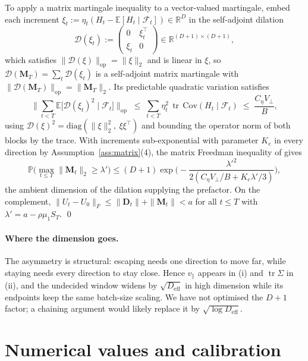 \documentclass{article}
\theoremstyle{plain}
\theoremstyle{definition}
\theoremstyle{remark}
\newcommand{\E}{\mathbb{E}}
\newcommand{\Prob}{\mathbb{P}}
\newcommand{\R}{\mathbb{R}}
\newcommand{\1}{\mathbf{1}}
\newcommand{\cF}{\mathcal{F}}
\newcommand{\Tr}{\operatorname{tr}}
\begin{document}
To apply a matrix martingale inequality to a vector-valued martingale, embed each
increment $\xi_t := \eta_t(H_t-\E[H_t\mid\cF_t])\in\R^D$ in the self-adjoint
dilation
\[
\mathcal D(\xi_t) := \begin{pmatrix}0 & \xi_t^\top\\ \xi_t & 0\end{pmatrix}
\in\R^{(D+1)\times(D+1)},
\]
which satisfies $\|\mathcal D(\xi)\|_{\mathrm{op}} = \|\xi\|_2$ and is linear in
$\xi$, so $\mathcal D(\mathbf M_T) = \sum_t\mathcal D(\xi_t)$ is a self-adjoint
matrix martingale with
$\|\mathcal D(\mathbf M_T)\|_{\mathrm{op}} = \|\mathbf M_T\|_2$. Its predictable
quadratic variation satisfies
\[
\Big\|\sum_{t<T}\E\big[\mathcal D(\xi_t)^2\mid\cF_t\big]\Big\|_{\mathrm{op}}
\;\le\; \sum_{t<T}\eta_t^2\,\Tr\,\mathrm{Cov}(H_t\mid\cF_t)
\;\le\; \frac{C_\eta V_\perp}{B},
\]
using $\mathcal D(\xi)^2 = \mathrm{diag}(\|\xi\|_2^2,\ \xi\xi^\top)$ and bounding
the operator norm of both blocks by the trace. With increments sub-exponential
with parameter $K_e$ in every direction by Assumption~\ref{ass:matrix}(4), the
matrix Freedman inequality of \citet{tropp2011freedman} gives
\[
\Prob\Big(\max_{t\le T}\|\mathbf M_t\|_2\ge\lambda'\Big)
\le (D+1)\exp\Big(-\frac{\lambda'^2}{2(C_\eta V_\perp/B+K_e\lambda'/3)}\Big),
\]
the ambient dimension of the dilation supplying the prefactor. On the complement,
$\|U_t-U_0\|_F\le\|\mathbf D_t\|+\|\mathbf M_t\|<a$ for all $t\le T$ with
$\lambda' = a-\rho\mu_1S_T$. \qed

\paragraph{Where the dimension goes.}
The asymmetry is structural: escaping needs one direction to move far, while
staying needs every direction to stay close. Hence $v_\parallel$ appears in (i)
and $\Tr\Sigma$ in (ii), and the undecided window widens by
$\sqrt{D_{\mathrm{eff}}}$ in high dimension while its endpoints keep the same
batch-size scaling. We have not optimised the $D+1$ factor; a chaining argument
would likely replace it by $\sqrt{\log D_{\mathrm{eff}}}$.

\section{Numerical values and calibration}
\label{app:numbers}
\end{document}

